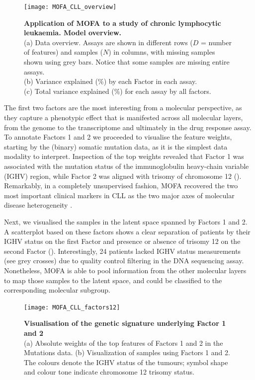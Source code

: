 \begin{figure}[H]
	\centering 	
	\texttt{[image: MOFA\_CLL\_overview]}
	\caption{\textbf{Application of MOFA to a study of chronic lymphocytic leukaemia. Model overview.}\\
	(a) Data overview. Assays are shown in different rows ($D$ = number of features) and samples ($N$) in columns, with missing samples shown using grey bars. Notice that some samples are missing entire assays.\\
	(b) Variance explained (\%) by each Factor in each assay.\\
	(c) Total variance explained (\%) for each assay by all factors.
	}
	\label{fig:MOFA_CLL_overview}
\end{figure}

The first two factors are the most interesting from a molecular perspective, as they capture a phenotypic effect that is manifested across all molecular layers, from the genome to the transcriptome and ultimately in the drug response assay.\\
To annotate Factors 1 and 2 we proceeded to visualise the feature weights, starting by the (binary) somatic mutation data, as it is the simplest data modality to interpret. Inspection of the top weights revealed that Factor 1 was associated with the mutation status of the immunoglobulin heavy-chain variable (IGHV) region, while Factor 2 was aligned with trisomy of chromosome 12 ().\\
Remarkably, in a completely unsupervised fashion, MOFA recovered the two most important clinical markers in CLL as the two major axes of molecular disease heterogeneity \cite{Fabbri2016,Bulian2017,Crombie2017}.

Next, we visualised the samples in the latent space spanned by Factors 1 and 2. A scatterplot based on these factors shows a clear separation of patients by their IGHV status on the first Factor and presence or absence of trisomy 12 on the second Factor (). Interestingly, 24 patients lacked IGHV status measurements (see grey crosses) due to quality control filtering in the DNA sequencing assay. Nonetheless, MOFA is able to pool information from the other molecular layers to map those samples to the latent space, and could be classified to the corresponding molecular subgroup.

\begin{figure}[H]
	\centering 	
	\texttt{[image: MOFA\_CLL\_factors12]}
	\caption{\textbf{Visualisation of the genetic signature underlying Factor 1 and 2}\\
	(a) Absolute weights of the top features of Factors 1 and 2 in the Mutations data.
	(b) Visualization of samples using Factors 1 and 2. The colours denote the IGHV status of the tumours; symbol shape and colour tone indicate chromosome 12 trisomy status.
	}
	\label{fig:MOFA_CLL_factors12}
\end{figure}

